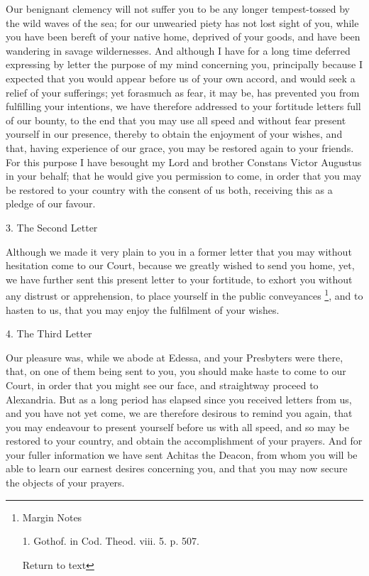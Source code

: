Our benignant clemency will not suffer you to be
any longer tempest-tossed by the wild waves of the sea; for our
unwearied piety has not lost sight of you, while you have been bereft
of your native home, deprived of your goods, and have been wandering
in savage wildernesses. And although I have for a long time deferred
expressing by letter the purpose of my mind concerning you,
principally because I expected that you would appear before us of your
own accord, and would seek a relief of your sufferings; yet forasmuch
as fear, it may be, has prevented you from fulfilling your intentions,
we have therefore addressed to your fortitude letters full of our
bounty, to the end that you may use all speed and without fear present
yourself in our presence, thereby to obtain the enjoyment of your
wishes, and that, having experience of our grace, you may be restored
again to your friends. For this purpose I have besought my Lord and
brother Constans Victor Augustus in your behalf; that he would give
you permission to come, in order that you may be restored to your
country with the consent of us both, receiving this as a pledge of our
favour.

3. The Second Letter

Although we made it very plain to you in a former
letter that you may without hesitation come to our Court, because we greatly wished to send you home, yet, we have further sent this
present letter to your fortitude, to exhort you without any distrust
or apprehension, to place yourself in the public conveyances \footnote{Margin Notes

1. Gothof. in Cod. Theod. viii. 5. p. 507.

Return to text}, and to hasten to us, that you may enjoy the fulfilment of your
wishes.

4. The Third Letter

Our pleasure was, while we abode at Edessa, and
your Presbyters were there, that, on one of them being sent to you,
you should make haste to come to our Court, in order that you might
see our face, and straightway proceed to Alexandria. But as a long
period has elapsed since you received letters from us, and you have
not yet come, we are therefore desirous to remind you again, that you
may endeavour to present yourself before us with all speed, and so may
be restored to your country, and obtain the accomplishment of your
prayers. And for your fuller information we have sent Achitas the
Deacon, from whom you will be able to learn our earnest desires
concerning you, and that you may now secure the objects of your
prayers.

